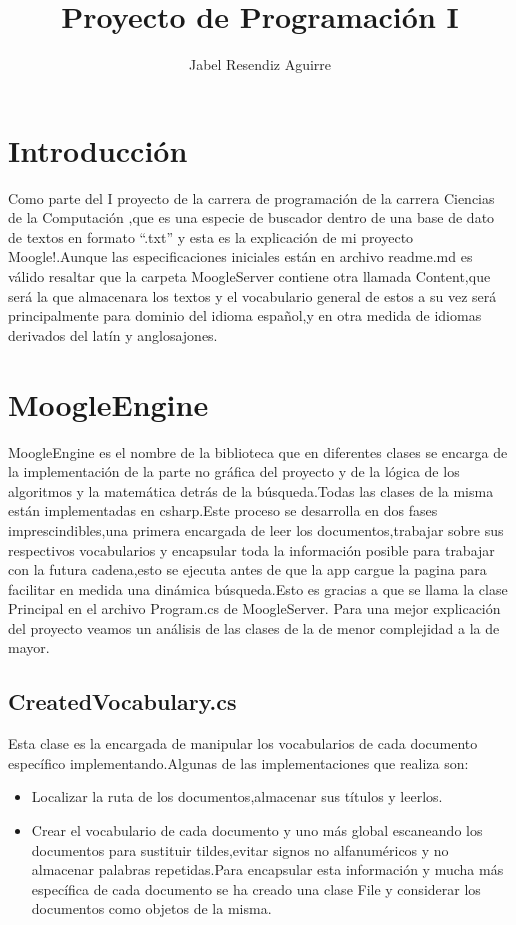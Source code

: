 \documentclass[a4paper,12pt]{article}
\begin{document}
\title{Proyecto de Programaci\'on I}
\author{Jabel Resendiz Aguirre}
\maketitle

\section{Introducci\'on}
    Como parte del I proyecto de la carrera de programación de la carrera Ciencias
de la Computación ,que es una especie de buscador dentro de una base de dato
de textos en formato “.txt” y esta es la explicación de mi proyecto Moogle!.Aunque las especificaciones iniciales están en archivo  readme.md es v\'alido resaltar que la carpeta
MoogleServer contiene otra llamada Content,que será la que almacenara los
textos y el vocabulario general de estos a  su vez será principalmente para
dominio del idioma español,y  en otra medida de idiomas derivados del latín y
anglosajones.



\section{MoogleEngine}\label{sec:intro}

MoogleEngine es el nombre de la biblioteca que en diferentes clases se
encarga de la implementación de la parte no gr\'afica del proyecto y de la lógica
de los algoritmos y la matemática detrás de la búsqueda.Todas las clases de
la misma están implementadas en csharp.Este proceso se desarrolla en dos fases
imprescindibles,una primera encargada de leer los documentos,trabajar sobre
sus respectivos vocabularios y encapsular  toda la información posible para
trabajar con la futura cadena,esto se ejecuta antes de que la app  cargue la
pagina para facilitar en medida una dinámica búsqueda.Esto es gracias a que
se llama la clase Principal en el archivo Program.cs de MoogleServer.
Para una mejor explicación del proyecto veamos un análisis de las  clases
de la  de menor complejidad a la de mayor.
 


\subsection{CreatedVocabulary.cs}\label{sub:center}

Esta clase es la encargada de manipular los vocabularios de cada documento
espec\'ifico implementando.Algunas de las  implementaciones que realiza son:
\begin{itemize}
    \item Localizar la ruta de los documentos,almacenar sus títulos y leerlos.
    \item Crear el vocabulario de cada documento y uno m\'as global escaneando los
    documentos para sustituir tildes,evitar signos no alfanuméricos y no
    almacenar palabras repetidas.Para encapsular esta información y mucha m\'as
    espec\'ifica de cada documento se ha creado una clase File y considerar los
    documentos como objetos de la misma.
    
\end{itemize}
\end{document}
